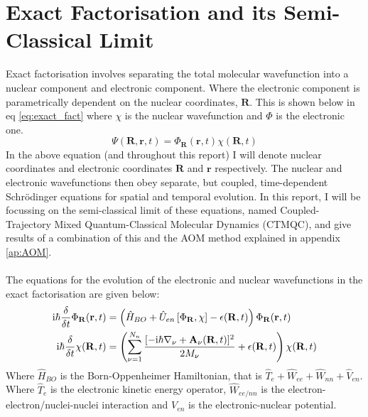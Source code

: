 \section{Exact Factorisation and its Semi-Classical Limit}
Exact factorisation \cite{abedi_exact_2010} involves separating the total molecular wavefunction into a nuclear component and electronic component. Where the electronic component is parametrically dependent on the nuclear coordinates, $\mathbf{R}$. This is shown below in eq \eqref{eq:exact_fact} where $\chi$ is the nuclear wavefunction and $\Phi$ is the electronic one.
\begin{equation}
 \Psi(\mathbf{R}, \mathbf{r}, t) = \Phi_{\mathbf{R}}(\mathbf{r}, t) \chi(\mathbf{R}, t)
 \label{eq:exact_fact}
 \end{equation}
 In the above equation (and throughout this report) I will denote nuclear coordinates and electronic coordinates $\mathbf{R}$ and $\mathbf{r}$ respectively. The nuclear and electronic wavefunctions then obey separate, but coupled, time-dependent Schr\"odinger equations for spatial and temporal evolution. In this report, I will be focussing on the semi-classical limit of these equations, named Coupled-Trajectory Mixed Quantum-Classical Molecular Dynamics (CTMQC), and give results of a combination of this and the AOM method explained in appendix \ref{ap:AOM}.
\\\\
The equations for the evolution of the electronic and nuclear wavefunctions in the exact factorisation \cite{abedi_exact_2010} are given below:
\begin{align}
  \mathrm{i}\hbar \frac{\delta}{\delta t} \Phi_{\mathbf{R}}(\mathbf{r}, t) &= \left( \hat{H}_{BO} + \hat{U}_{en}\left[ \Phi_{\mathbf{R}}, \chi\right] - \epsilon(\mathbf{R}, t) \right) \Phi_{\mathbf{R}} (\mathbf{r}, t)
  \label{eq:electronic_exact}
\\
\mathrm{i}\hbar \frac{\delta}{\delta t} \chi (\mathbf{R}, t) &= \left( \sum_{\nu = 1}^{N_{n}} \frac{[-\mathrm{i}\hbar\nabla_{\nu} + \mathbf{A}_{\nu}(\mathbf{R}, t)]^2}{2 M_{\nu}} + \epsilon(\mathbf{R}, t)\right) \chi (\mathbf{R}, t)
  \label{eq:nuclear_exact}
\end{align}
Where $\hat{H}_{BO}$ is the Born-Oppenheimer Hamiltonian, that is $\hat{T}_{e} + \hat{W}_{ee} + \hat{W}_{nn} + \hat{V}_{en}$. Where $\hat{T}_{e}$ is the electronic kinetic energy operator, $\hat{W}_{ee/nn}$ is the electron-electron/nuclei-nuclei interaction and $V_{en}$ is the electronic-nuclear potential.
\\\\
